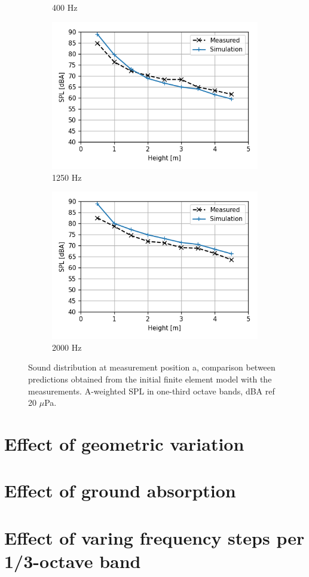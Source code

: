 \begin{figure}[H]
\begin{subfigure}[b]{0.49\textwidth}
		\caption{400 Hz}
	\end{subfigure}
	\begin{subfigure}[b]{0.49\textwidth}
		\centering
		\includegraphics[width=\textwidth]{fig/chap5/initial_model/third_octave_over_height/1250_Hz.png}
		\caption{1250 Hz}
	\end{subfigure}
	\begin{subfigure}[b]{0.49\textwidth}
		\centering
		\includegraphics[width=\textwidth]{fig/chap5/initial_model/third_octave_over_height/2000_Hz.png}
		\caption{2000 Hz}
	\end{subfigure}
	\caption{Sound distribution at measurement position a, comparison between predictions obtained from the initial finite element model with the measurements. A-weighted SPL in one-third octave bands, dBA ref 20 $\mu$Pa.}
	\label{fig:third_octave_over_height}
\end{figure}


\section{Effect of geometric variation}

\section{Effect of ground absorption}

\section{Effect of varing frequency steps per 1/3-octave band}